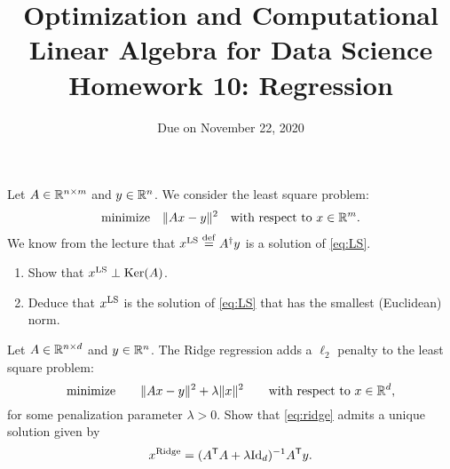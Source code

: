 \documentclass[11pt,nocut]{article}
\title{\vspace{-2.0cm}%
	Optimization and Computational Linear Algebra for Data Science\\
Homework 10: Regression}
\date{\vspace{-1cm}Due on November 22, 2020}
\begin{document}
\maketitle


\vspace{1mm}



\begin{problem}[2 points]
	Let $A \in \mathbb{R}^{n \times m}$ and $y \in \mathbb{R}^n$. We consider the least square problem:
	\begin{equation}\label{eq:LS}
		\text{minimize} \quad \|Ax-y\|^2 \quad \text{with respect to} \ x \in \R^m.
	\end{equation}
	We know from the lecture that $x^{\rm LS} \overset{\rm def}{=} A^{\dagger}y$ is a solution of \eqref{eq:LS}. 
	\begin{enumerate}[label=\normalfont(\textbf{\alph*})]
		\item Show that $x^{\rm LS} \perp {{\rm Ker}}(A)$.
		\item Deduce that $x^{\rm LS}$ is the solution of \eqref{eq:LS} that has the smallest (Euclidean) norm.
	\end{enumerate}
\end{problem}

\vspace{4mm}

\begin{problem}[2 points]
	Let $A \in \mathbb{R}^{n \times d}$ and $y \in \mathbb{R}^n$.
	The Ridge regression adds a $\ell_2$ penalty to the least square problem:
	\begin{equation}\label{eq:ridge}
		\text{minimize} \qquad
		\| Ax - y \|^2 + \lambda \|x\|^2 \qquad \text{with respect to} \ x \in \R^d,
	\end{equation}
	for some penalization parameter $\lambda >0$.
	Show that \eqref{eq:ridge} admits a unique solution given by
	$$
	x^{\rm Ridge} = (A^{{\sf T}} A + \lambda {{\rm Id}}_d)^{-1} A^{{\sf T}} y.
	$$
\end{problem}


\vspace{4mm}
\end{document}
